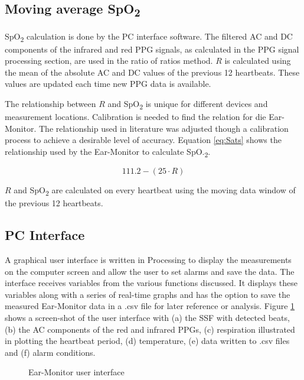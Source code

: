 \subsection{Moving average SpO\textsubscript{2}}
SpO\textsubscript{2} calculation is done by the PC interface software. The filtered AC and DC components of the infrared and red PPG signals, as calculated in the PPG signal processing section, are used in the ratio of ratios method. $R$ is calculated using the mean of the absolute AC and DC values of the previous 12 heartbeats. These values are updated each time new PPG data is available.

\medskip

The relationship between $R$ and SpO\textsubscript{2} is unique for different devices and measurement locations. Calibration is needed to find the relation for die Ear-Monitor. The relationship used in literature \citep{ti2012application} was adjusted though a calibration process to achieve a desirable level of accuracy. Equation \ref{eq:Sats} shows the relationship used by the Ear-Monitor to calculate SpO.\textsubscript{2}.

\begin{equation}
\label{eq:Sats}
111.2-(25\cdot R)
\end{equation}

$R$ and SpO\textsubscript{2} are calculated on every heartbeat using the moving data window of the previous 12 heartbeats.

\subsection{PC Interface}
A graphical user interface is written in Processing to display the measurements on the computer screen and allow the user to set alarms and save the data. The interface receives variables from the various functions discussed. It displays these variables along with a series of real-time graphs and has the option to save the measured Ear-Monitor data in a .csv file for later reference or analysis. Figure \ref{fig:GUI} shows a screen-shot of the user interface with (a) the SSF with detected beats, (b) the AC components of the red and infrared PPGs, (c) respiration illustrated in plotting the heartbeat period, (d) temperature, (e) data written to .csv files and (f) alarm conditions.

\begin{figure}[H]
\centering
\graphicspath{{figs/}}

\caption{Ear-Monitor user interface}
\label{fig:GUI}
\end{figure}

 
